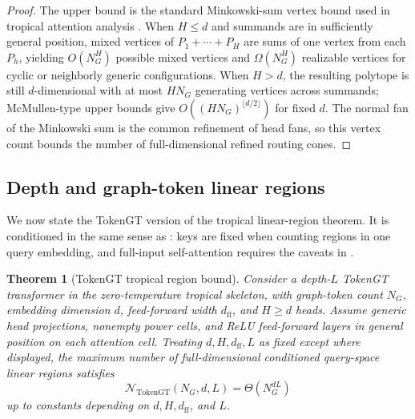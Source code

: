 \documentclass[11pt]{article}
\newtheorem{theorem}{Theorem}[section]
\begin{document}
\begin{proof}
The upper bound is the standard Minkowski-sum vertex bound used in tropical attention analysis \cite{gritzmann1993minkowski,su2026tropicalexpressivity}.  When $H\le d$ and summands are in sufficiently general position, mixed vertices of $P_1+\cdots+P_H$ are sums of one vertex from each $P_h$, yielding $O(N_G^H)$ possible mixed vertices and $\Omega(N_G^H)$ realizable vertices for cyclic or neighborly generic configurations.  When $H>d$, the resulting polytope is still $d$-dimensional with at most $HN_G$ generating vertices across summands; McMullen-type upper bounds give $O((HN_G)^{\lfloor d/2\rfloor})$ for fixed $d$.  The normal fan of the Minkowski sum is the common refinement of head fans, so this vertex count bounds the number of full-dimensional refined routing cones.
\end{proof}

\subsection{Depth and graph-token linear regions}

We now state the TokenGT version of the tropical linear-region theorem.  It is conditioned in the same sense as \cite{su2026tropicalexpressivity}: keys are fixed when counting regions in one query embedding, and full-input self-attention requires the caveats in .

\begin{theorem}[TokenGT tropical region bound]
\label{thm:tokengt-regions}
Consider a depth-$L$ TokenGT transformer in the zero-temperature tropical skeleton, with graph-token count $N_G$, embedding dimension $d$, feed-forward width $d_{\mathrm{ff}}$, and $H\ge d$ heads.  Assume generic head projections, nonempty power cells, and ReLU feed-forward layers in general position on each attention cell.  Treating $d,H,d_{\mathrm{ff}},L$ as fixed except where displayed, the maximum number of full-dimensional conditioned query-space linear regions satisfies
\[
  \mathcal{N}_{\mathrm{TokenGT}}(N_G,d,L)
  =
  \Theta(N_G^{dL})
\]
up to constants depending on $d,H,d_{\mathrm{ff}}$, and $L$.
\end{theorem}
\end{document}
